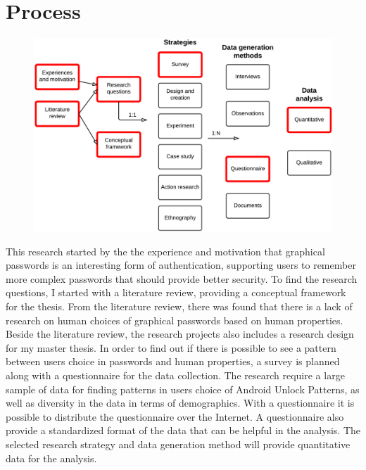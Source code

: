   \section*{Process}

  \begin{figure}
     \vspace{-20pt}
     \begin{center}
        \includegraphics[scale=0.13]{ResearchProcess.png}
     \end{center}
     \vspace{-5pt}
   \end{figure}

  This research started by the the experience and motivation that graphical passwords is an interesting form of authentication, supporting users to remember more complex passwords that should provide better security. To find the research questions, I started with a literature review, providing a conceptual framework for the thesis. From the literature review, there was found that there is a lack of research on human choices of graphical passwords based on human properties. Beside the literature review, the research projects also includes a research design for my master thesis. In order to find out if there is possible to see a pattern between users choice in passwords and human properties, a survey is planned along with a questionnaire for the data collection. The research require a large sample of data for finding patterns in users choice of Android Unlock Patterns, as well as diversity in the data in terms of demographics. With a questionnaire it is possible to distribute the questionnaire over the Internet. A questionnaire also provide a standardized format of the data that can be helpful in the analysis. The selected research strategy and data generation method will provide quantitative data for the analysis.

